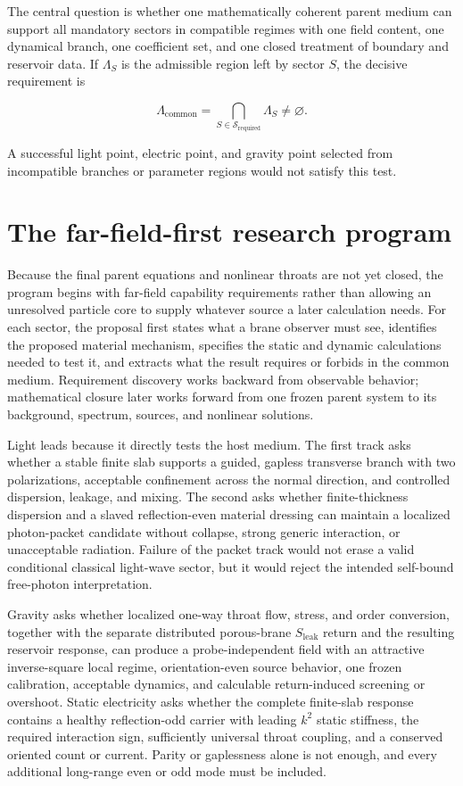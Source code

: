 The central question is whether one mathematically coherent parent medium can
support all mandatory sectors in compatible regimes with one field content, one
dynamical branch, one coefficient set, and one closed treatment of boundary and
reservoir data. If \(\Lambda_S\) is the admissible region left by sector \(S\),
the decisive requirement is

\[
\Lambda_{\mathrm{common}}
=
\bigcap_{S\in\mathcal S_{\mathrm{required}}}\Lambda_S
\neq\varnothing.
\]

A successful light point, electric point, and gravity point selected from
incompatible branches or parameter regions would not satisfy this test.

\section{The far-field-first research program}

Because the final parent equations and nonlinear throats are not yet closed, the
program begins with far-field capability requirements rather than allowing an
unresolved particle core to supply whatever source a later calculation needs. For
each sector, the proposal first states what a brane observer must see, identifies
the proposed material mechanism, specifies the static and dynamic calculations
needed to test it, and extracts what the result requires or forbids in the common
medium. Requirement discovery works backward from observable behavior;
mathematical closure later works forward from one frozen parent system to its
background, spectrum, sources, and nonlinear solutions.

Light leads because it directly tests the host medium. The first track asks
whether a stable finite slab supports a guided, gapless transverse branch with two
polarizations, acceptable confinement across the normal direction, and controlled
dispersion, leakage, and mixing. The second asks whether finite-thickness
dispersion and a slaved reflection-even material dressing can maintain a localized
photon-packet candidate without collapse, strong generic interaction, or
unacceptable radiation. Failure of the packet track would not erase a valid
conditional classical light-wave sector, but it would reject the intended
self-bound free-photon interpretation.

Gravity asks whether localized one-way throat flow, stress, and order conversion,
together with the separate distributed porous-brane \(S_{\mathrm{leak}}\) return
and the resulting reservoir response, can produce a probe-independent field with
an attractive inverse-square local regime, orientation-even source behavior, one
frozen calibration, acceptable dynamics, and calculable return-induced screening
or overshoot. Static electricity
asks whether the complete finite-slab response contains a healthy reflection-odd
carrier with leading \(k^2\) static stiffness, the required interaction sign,
sufficiently universal throat coupling, and a conserved oriented count or current.
Parity or gaplessness alone is not enough, and every additional long-range even or
odd mode must be included.

